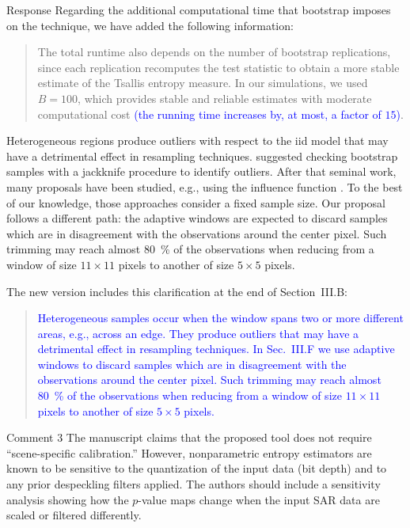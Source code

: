 \documentclass[11pt]{report}
\begin{document}
\begin{responsebox}{Response}
Regarding the additional computational time that bootstrap imposes on the technique, we have added the following information:
\begin{quote}
The total runtime also depends on the number of bootstrap replications, since each replication recomputes the test statistic to obtain a more stable estimate of the Tsallis entropy measure. In our simulations, we used $B=100$, which provides stable and reliable estimates with moderate computational cost \textcolor{blue}{(the running time increases by, at most, a factor of $15$)}. 
\end{quote}

Heterogeneous regions produce outliers
with respect to the iid model 
that may have a detrimental effect in resampling techniques.
\citet{JackknifeAfterBootstrapStandardErrorsandInfluenceFunctions} suggested checking bootstrap samples with a jackknife procedure to identify outliers.
After that seminal work, many proposals have been studied, e.g., using the influence function \citep{RobustBootstrapwithNonRandomWeightsBasedontheInfluenceFunction}.
To the best of our knowledge, those approaches consider a fixed sample size.
Our proposal follows a different path: the adaptive windows are expected to discard samples which are in disagreement with the observations around the center pixel.
Such trimming may reach almost \SI{80}{\percent} of the observations when reducing from a window of size $11\times11$ pixels to another of size $5\times5$ pixels.

The new version includes this clarification at the end of Section~III.B:
\begin{quote}
\textcolor{blue}{Heterogeneous samples occur when the window spans two or more different areas, 
e.g., across an edge.
They produce outliers that may have a detrimental effect in resampling techniques.
In Sec.~III.F we use adaptive windows to discard samples which are in disagreement with the observations around the center pixel.
Such trimming may reach almost \SI{80}{\percent} of the observations when reducing from a window of size $11\times11$ pixels to another of size $5\times5$ pixels.
}
\end{quote}

\end{responsebox}

\vspace{1em}

\begin{reviewbox}{Comment 3}
The manuscript claims that the proposed tool does not require ``scene-specific calibration.'' However, nonparametric entropy estimators are known to be sensitive to the quantization of the input data (bit depth) and to any prior despeckling filters applied. The authors should include a sensitivity analysis showing how the $p$-value maps change when the input SAR data are scaled or filtered differently.
\end{reviewbox}
\end{document}
